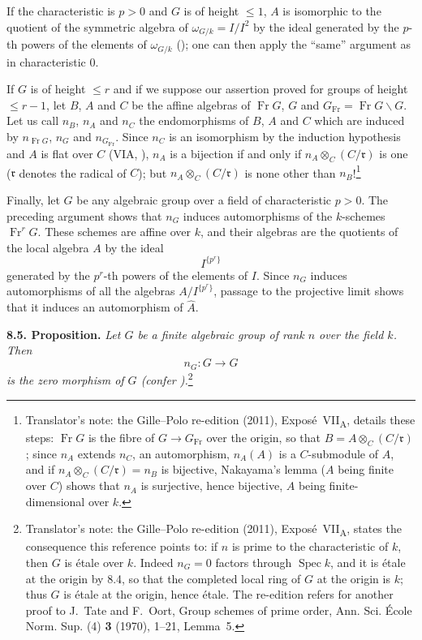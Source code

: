 If the characteristic is \(p>0\) and \(G\) is of height \(\leq1\), \(A\)
is isomorphic to the quotient of the symmetric algebra of
\(\omega_{G/k}=I/I^2\) by the ideal generated by the \(p\)-th powers of
the elements of \(\omega_{G/k}\) (); one can then apply the ``same''
argument as in characteristic \(0\).

If \(G\) is of height \(\leq r\) and if we suppose our assertion proved for
groups of height \(\leq r-1\), let \(B\), \(A\) and \(C\) be the affine
algebras of \(\operatorname{Fr}G\), \(G\) and
\(G_{\mathrm{Fr}}=\operatorname{Fr}G\backslash G\). Let us call \(n_B\),
\(n_A\) and \(n_C\) the endomorphisms of \(B\), \(A\) and \(C\) which are
induced by \(n_{\operatorname{Fr}G}\), \(n_G\) and
\(n_{G_{\mathrm{Fr}}}\). Since \(n_C\) is an isomorphism by the induction
hypothesis and \(A\) is flat over \(C\) (VIA, ), \(n_A\) is a
bijection if and only if \(n_A\otimes_C(C/\mathfrak r)\) is one
(\(\mathfrak r\) denotes the radical of \(C\)); but
\(n_A\otimes_C(C/\mathfrak r)\) is none other than \(n_B\)!\footnote{Translator's
note: the Gille--Polo re-edition (2011), Expos\'e~VII\textsubscript{A},
details these steps: \(\operatorname{Fr}G\) is the fibre of
\(G\to G_{\mathrm{Fr}}\) over the origin, so that
\(B=A\otimes_C(C/\mathfrak r)\); since \(n_A\) extends \(n_C\), an
automorphism, \(n_A(A)\) is a \(C\)-submodule of \(A\), and if
\(n_A\otimes_C(C/\mathfrak r)=n_B\) is bijective, Nakayama's lemma (\(A\)
being finite over \(C\)) shows that \(n_A\) is surjective, hence bijective,
\(A\) being finite-dimensional over \(k\).}

Finally, let \(G\) be any algebraic group over a field of
characteristic \(p>0\). The preceding argument shows that
\(n_G\) induces automorphisms of the \(k\)-schemes
\(\operatorname{Fr}^rG\). These schemes are affine over \(k\),
and their algebras are the quotients of the local algebra \(A\)
by the ideal
\[
  I^{\{p^r\}}
\]
generated by the \(p^r\)-th powers of the elements of \(I\).
Since \(n_G\) induces automorphisms of all the algebras
\(A/I^{\{p^r\}}\), passage to the projective limit shows that it
induces an automorphism of \(\widehat A\).

\medskip
\noindent\textbf{8.5. Proposition.}
\label{sga3:VIIA:8.5}
\textit{Let \(G\) be a finite algebraic group of rank \(n\) over
the field \(k\). Then
\[
  n_G:G\longrightarrow G
\]
is the zero morphism of \(G\) \textup{(confer )}.}\footnote{Translator's note:
the Gille--Polo re-edition (2011), Expos\'e~VII\textsubscript{A}, states
the consequence this reference points to: if \(n\) is prime to the
characteristic of \(k\), then \(G\) is \'etale over \(k\). Indeed
\(n_G=0\) factors through \(\operatorname{Spec}k\), and it is \'etale at
the origin by 8.4, so that the completed local ring of \(G\) at the origin
is \(k\); thus \(G\) is \'etale at the origin, hence \'etale. The
re-edition refers for another proof to J.~Tate and F.~Oort, Group schemes
of prime order, Ann. Sci. \'Ecole Norm. Sup. (4) \textbf{3} (1970), 1--21,
Lemma~5.}

